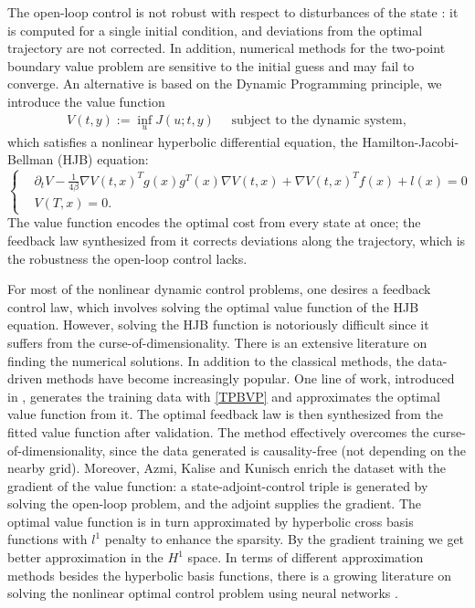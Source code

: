 \documentclass[11pt]{amsart}
\theoremstyle{definition}
\theoremstyle{remark}
\begin{document}
The open-loop control is not robust with respect to disturbances of the state \cite{azmi2021optimal}: it is computed for a single initial condition, and deviations from the optimal trajectory are not corrected. In addition, numerical methods for the two-point boundary value problem are sensitive to the initial guess and may fail to converge.
An alternative is based on the Dynamic Programming principle,  we introduce the value function
\begin{align*}
	 V(t, y):= \inf_u J(u; t, y) \quad \text{ subject to the dynamic system},
\end{align*}
which satisfies a nonlinear hyperbolic differential equation, the Hamilton-Jacobi-Bellman (HJB) equation:
\begin{equation*} 
\tag{HJB}\label{HJB}
\left\{
\begin{aligned}
	& \partial_t V - \frac{1}{4\beta} \nabla V(t, x)^T  g(x) g^T(x) \nabla V (t, x) + \nabla V(t, x)^T f(x) + l(x)  = 0 \\
	& V(T, x) = 0.
\end{aligned}
\right.
\end{equation*}
The value function encodes the optimal cost from every state at once; the feedback law synthesized from it corrects deviations along the trajectory, which is the robustness the open-loop control lacks.

For most of the nonlinear dynamic control problems, one desires a feedback control law, which involves solving the optimal value function of 
the HJB equation. 
However, solving the HJB function is notoriously difficult since it suffers from the curse-of-dimensionality.
There is an extensive literature on finding the numerical solutions. 
In addition to the classical methods, the data-driven methods have become increasingly popular. 
One line of work, introduced in \cite{nakamura2021adaptive}, generates the training data with \eqref{TPBVP} and approximates the optimal value function from it.
The optimal feedback law is then synthesized from the fitted value function after validation.
The method effectively overcomes the curse-of-dimensionality, since the data generated is causality-free (not depending on the nearby grid).
Moreover, Azmi, Kalise and Kunisch \cite{azmi2021optimal} enrich the dataset with the gradient of the value function: a state-adjoint-control triple is generated by solving the open-loop problem, and the adjoint supplies the gradient. 
The optimal value function is in turn approximated by hyperbolic cross basis functions with $l^1$ penalty to enhance the sparsity.
By the gradient training we get better approximation in the $H^1$ space. 
In terms of different approximation methods besides the hyperbolic basis functions, there is a growing literature on solving the nonlinear optimal control problem using neural networks \cite{lutter2020hjb, shilova2023revisiting}.\par   
\end{document}
